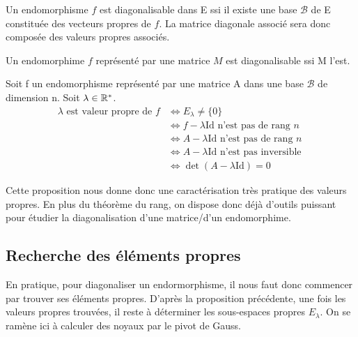 \begin{proposition}
    Un endomorphisme $f$ est diagonalisable dans E ssi il existe une base $\mathcal{B}$ de E 
    constituée des vecteurs propres de $f$. 
    La matrice diagonale associé sera donc composée des valeurs propres associés. 
\end{proposition}

\begin{proposition}
    Un endomorphime $f$ représenté par une matrice $M$ est diagonalisable ssi M l'est. 
\end{proposition}


\begin{proposition}
    Soit f un endomorphisme représenté par une matrice A dans une base $\mathcal{B}$ de dimension n. 
    Soit $ \lambda \in \mathbb{R}^*$. 
    \begin{align*}
        \lambda \text{ est valeur propre de } f & \iff E_\lambda \not = \{ 0 \} \\ 
                                                & \iff f - \lambda \text{Id} \text{ n'est pas de rang } n \\ 
                                                & \iff A - \lambda \text{Id} \text{ n'est pas de rang } n \\ 
                                                & \iff A - \lambda \text{Id} \text{ n'est pas inversible } \\ 
                                                & \iff \det (A - \lambda \text{Id}) = 0 
    \end{align*}
\end{proposition}

Cette proposition nous donne donc une caractérisation très pratique des valeurs propres. 
En plus du théorème du rang, on dispose donc déjà d'outils puissant pour étudier la diagonalisation d'une matrice/d'un endomorphime. 


\subsection{Recherche des éléments propres}

En pratique, pour diagonaliser un endormorphisme, il nous faut donc commencer par trouver ses éléments propres. 
D'après la proposition précédente, une fois les valeurs propres trouvées, il reste à déterminer les sous-espaces propres $E_\lambda$.
On se ramène ici à calculer des noyaux par le pivot de Gauss. 

